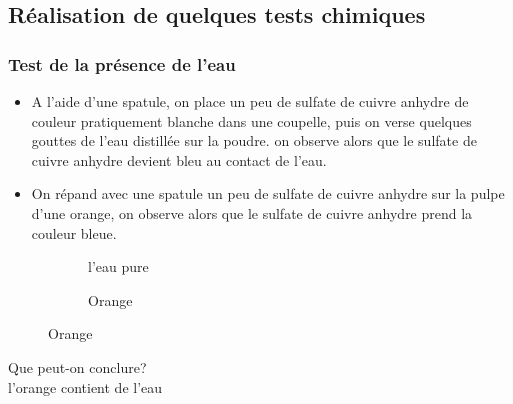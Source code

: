 \documentclass[12pt,a4paper]{book}
\begin{document}
{\subsection{Réalisation de quelques tests chimiques}
\subsubsection{Test de la présence de l'eau}
\noindent
\begin{itemize}
\item A l'aide d'une spatule, on place un peu de sulfate de cuivre anhydre de couleur pratiquement blanche dans une coupelle, puis on verse quelques gouttes de l'eau distillée sur la poudre. on observe alors que le sulfate de cuivre anhydre devient bleu au contact de l'eau.\\
\item On répand avec une spatule un peu de sulfate de cuivre anhydre sur la pulpe d'une orange, on observe alors que le sulfate de cuivre anhydre prend la couleur bleue.
\end{itemize}
\begin{figure}[!h]
\begin{subfigure}{.5\textwidth}
  \centering
  \caption{l'eau pure}
  \label{fig:c1im1_2}
\end{subfigure}%
\begin{subfigure}{.5\textwidth}
  \centering
  \caption{Orange}
  \label{fig:c1im1_1}
\end{subfigure}
\label{fig:c1im1_2}
\end{figure}
\noindent
Que peut-on conclure?
\\l'orange contient de l'eau
}
\end{document}
